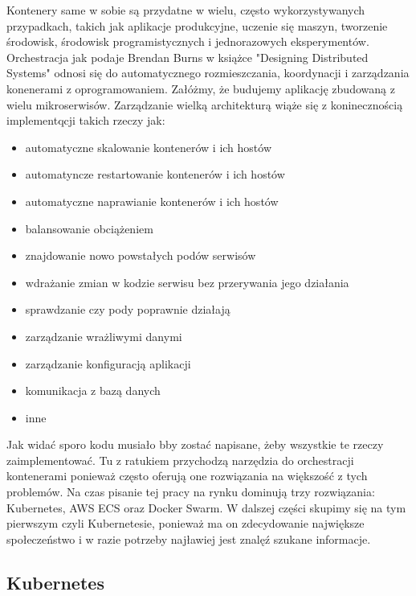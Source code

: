 Kontenery same w sobie są przydatne w wielu, często wykorzystywanych przypadkach, takich jak aplikacje produkcyjne, uczenie się maszyn, tworzenie środowisk, środowisk programistycznych i jednorazowych eksperymentów. Orchestracja jak podaje Brendan Burns w książce "Designing Distributed Systems" odnosi się do automatycznego rozmieszczania, koordynacji i zarządzania konenerami z oprogramowaniem. Załóżmy, że budujemy aplikację zbudowaną z wielu mikroserwisów. Zarządzanie wielką architekturą wiąże się z koninecznością implementqcji takich rzeczy jak:
\begin{itemize}
    \item automatyczne skalowanie kontenerów i ich hostów
    \item automatyncze restartowanie kontenerów i ich hostów
    \item automatyczne naprawianie kontenerów i ich hostów
    \item balansowanie obciążeniem 
    \item znajdowanie nowo powstałych podów serwisów 
    \item wdrażanie zmian w kodzie serwisu bez przerywania jego działania 
    \item sprawdzanie czy pody poprawnie działają
    \item zarządzanie wrażliwymi danymi
    \item zarządzanie konfiguracją aplikacji
    \item komunikacja z bazą danych
    \item inne
\end{itemize}
Jak widać sporo kodu musiało bby zostać napisane, żeby wszystkie te rzeczy zaimplementować. Tu z ratukiem przychodzą narzędzia do orchestracji kontenerami ponieważ często oferują one rozwiązania na większość z tych problemów. Na czas pisanie tej pracy na rynku dominują trzy rozwiązania: Kubernetes, AWS ECS oraz Docker Swarm. W dalszej części skupimy się na tym pierwszym czyli Kubernetesie, ponieważ ma on zdecydowanie największe społeczeństwo i w razie potrzeby najławiej jest znalęź szukane informacje.

\subsection{Kubernetes}

